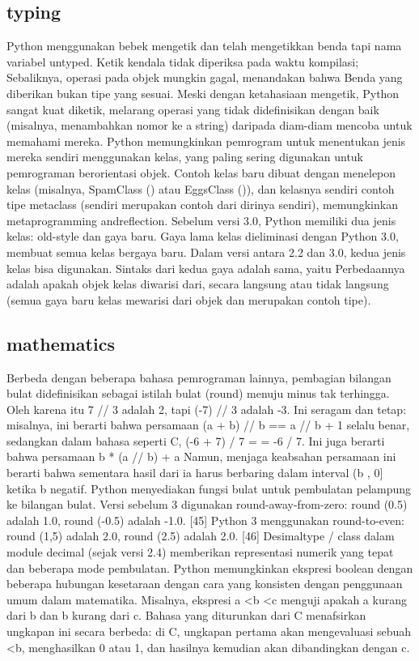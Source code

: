 \subsection {typing}
	Python menggunakan bebek mengetik dan telah mengetikkan benda tapi nama variabel untyped. Ketik kendala tidak diperiksa pada waktu kompilasi; Sebaliknya, operasi pada objek mungkin gagal, menandakan bahwa
	Benda yang diberikan bukan tipe yang sesuai. Meski dengan ketahasiaan mengetik, Python sangat kuat diketik, melarang operasi yang tidak didefinisikan dengan baik (misalnya, menambahkan nomor ke a
	string) daripada diam-diam mencoba untuk memahami mereka. Python memungkinkan pemrogram untuk menentukan jenis mereka sendiri menggunakan kelas, yang paling sering
	digunakan untuk pemrograman berorientasi objek. Contoh kelas baru dibuat dengan menelepon kelas (misalnya, SpamClass () atau EggsClass ()), dan kelasnya sendiri
	contoh tipe metaclass (sendiri merupakan contoh dari dirinya sendiri), memungkinkan metaprogramming andreflection. Sebelum versi 3.0, Python memiliki dua jenis kelas: old-style dan gaya baru. Gaya lama
	kelas dieliminasi dengan Python 3.0, membuat semua kelas bergaya baru. Dalam versi antara 2.2 dan 3.0, kedua jenis kelas bisa digunakan. Sintaks dari kedua gaya adalah sama, yaitu
	Perbedaannya adalah apakah objek kelas diwarisi dari, secara langsung atau tidak langsung (semua gaya baru kelas mewarisi dari objek dan merupakan contoh tipe).
      
\subsection {mathematics}
	Berbeda dengan beberapa bahasa pemrograman lainnya, pembagian bilangan bulat didefinisikan sebagai istilah bulat (round) menuju minus tak terhingga. 
	Oleh karena itu 7 // 3 adalah 2, tapi (-7) // 3 adalah -3. Ini seragam dan tetap: misalnya, ini berarti bahwa persamaan (a + b) // b == a // b + 1 selalu benar, 
	sedangkan dalam bahasa seperti C, (-6 + 7) / 7 = = -6 / 7. Ini juga berarti bahwa persamaan b * (a // b) + a%
	Namun, menjaga keabsahan persamaan ini berarti bahwa sementara hasil dari%
	ia harus berbaring dalam interval (b , 0] ketika b negatif.
	Python menyediakan fungsi bulat untuk pembulatan pelampung ke bilangan bulat. Versi sebelum 3 digunakan round-away-from-zero: round (0.5) adalah 1.0, round (-0.5) adalah -1.0. [45] Python 3 menggunakan round-to-even: round (1,5) adalah 2.0, round (2.5) adalah 2.0. [46] Desimaltype / class dalam module decimal (sejak versi 2.4) memberikan representasi numerik yang tepat dan beberapa mode pembulatan.
	Python memungkinkan ekspresi boolean dengan beberapa hubungan kesetaraan dengan cara yang konsisten dengan penggunaan umum dalam matematika. Misalnya, ekspresi a <b <c menguji apakah a kurang dari b dan b kurang dari c. Bahasa yang diturunkan dari C menafsirkan ungkapan ini secara berbeda: di C, ungkapan pertama akan mengevaluasi sebuah <b, menghasilkan 0 atau 1, dan hasilnya kemudian akan dibandingkan dengan c.


